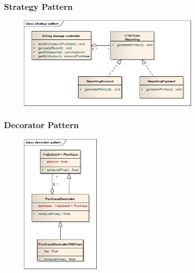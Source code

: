 


\subsubsection{Strategy Pattern}
\begin{figure}[H]
 \centering
 \includegraphics[width=0.8\textwidth]{../strategyPattern.png}
\end{figure}




\subsubsection{Decorator Pattern}
\begin{figure}[H]
 \centering
 \includegraphics[width=0.35\textwidth]{../decoratorPattern.png}
\end{figure}




